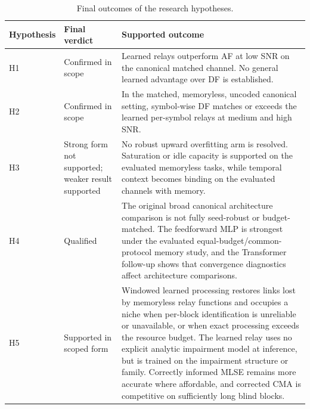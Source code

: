 \begin{table}[t]
    \centering
    \caption{Final outcomes of the research hypotheses.}
    \label{tbl:table33}
    \small
    \begin{tabularx}{\textwidth}{p{}
                                     p{}X}
        \toprule
        Hypothesis & Final verdict & Supported outcome \\
        \midrule
        H1 & Confirmed in scope
        & Learned relays outperform AF at low SNR on the canonical
          matched channel.  No general learned advantage over DF is
          established. \\

        H2 & Confirmed in scope
        & In the matched, memoryless, uncoded canonical setting,
          symbol-wise DF matches or exceeds the learned per-symbol relays
          at medium and high SNR. \\

        H3 & Strong form not supported; weaker result supported
        & No robust upward overfitting arm is resolved.  Saturation or idle
          capacity is supported on the evaluated memoryless tasks, while
          temporal context becomes binding on the evaluated channels with
          memory. \\

        H4 & Qualified
        & The original broad canonical architecture comparison is not fully
          seed-robust or budget-matched.  The feedforward MLP is strongest
          under the evaluated equal-budget/common-protocol memory study, and
          the Transformer follow-up shows that convergence diagnostics affect
          architecture comparisons. \\

        H5 & Supported in scoped form
        & Windowed learned processing restores links lost by memoryless relay
          functions and occupies a niche when per-block identification is
          unreliable or unavailable, or when exact processing exceeds the
          resource budget.  The learned relay uses no explicit analytic
          impairment model at inference, but is trained on the impairment
          structure or family.  Correctly informed MLSE remains more accurate
          where affordable, and corrected CMA is competitive on sufficiently
          long blind blocks. \\
        \bottomrule
    \end{tabularx}
\end{table}

